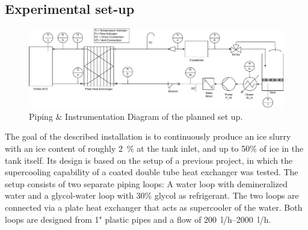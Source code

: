 \documentclass[english]{SFOEYearlyReportEnglish_2018}
\begin{document}
\subsection{Experimental set-up}

\begin{figure}[!htbp]
    \centering
    \includegraphics[trim={0 0 0 0},clip,width=\textwidth]{figures/SetUp_v01.pdf}
    \caption{Piping \& Instrumentation Diagram of the planned set up.}
   \label{fig:setup}
\end{figure}

\noindent
 The goal of the described installation is to continuously produce an ice  slurry with an ice content of roughly 2~\% at the tank inlet, and up to 50\% of ice in the tank itself. Its design is based on the setup of a previous project, in which the supercooling capability of a coated double tube heat exchanger was tested. The setup consists of two separate piping loops: A water loop with demineralized water and a glycol-water loop with 30\% glycol as refrigerant. The two loops are connected via a plate heat exchanger that acts as supercooler of the water. Both loops are designed from 1" plastic pipes and a flow of \SIrange{200}{2000}{l/h}.
\end{document}

